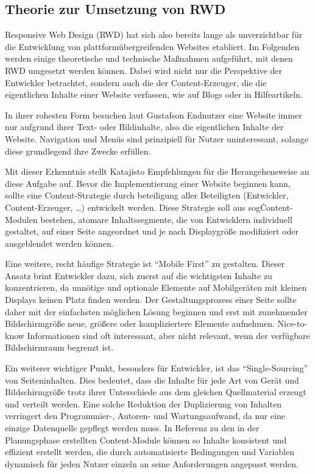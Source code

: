 
\subsection{Theorie zur Umsetzung von RWD}

Responsive Web Design (RWD) hat sich also bereits lange als unverzichtbar für die Entwicklung von plattformübergreifenden Websites etabliert.
Im Folgenden werden einige theoretische und technische Maßnahmen aufgeführt, mit denen RWD umgesetzt werden können.
Dabei wird nicht nur die Perspektive der Entwickler betrachtet, sondern auch die der Content-Erzeuger, die die eigentlichen Inhalte einer Website verfassen, wie auf Blogs oder in Hilfeartikeln.

In ihrer rohesten Form besuchen laut Gustafson \autocite[Kap. 1]{Gustafson.AdaptiveWebDesign.2011} Endnutzer eine Website immer nur aufgrund ihrer Text- oder Bildinhalte, also die eigentlichen Inhalte der Website.
Navigation und Menüs sind prinzipiell für Nutzer uninteressant, solange diese grundlegend ihre Zwecke erfüllen.

Mit dieser Erkenntnis stellt Katajisto \autocite[S. 4]{Katajisto.CreatingSupportContent.2015} Empfehlungen für die Herangehensweise an diese Aufgabe auf.
Bevor die Implementierung einer Website beginnen kann, sollte eine Content-Strategie durch beteiligung aller Beteiligten (Entwickler, Content-Erzeuger, \ldots) entwickelt werden.
Diese Strategie soll aus sog\. Content-Modulen bestehen, atomare Inhaltssegmente, die von Entwicklern individuell gestaltet, auf einer Seite angeordnet und je nach Displaygröße modifiziert oder ausgeblendet werden können.

Eine weitere, recht häufige Strategie ist "`Mobile First"' \autocite{Wroblewski.MobileFirst.2009} zu gestalten.
Dieser Ansatz brint Entwickler dazu, sich zuerst auf die wichtigsten Inhalte zu konzentrieren, da unnötige und optionale Elemente auf Mobilgeräten mit kleinen Displays keinen Platz finden werden.
Der Gestaltungsprozess einer Seite sollte daher mit der einfachsten möglichen Lösung beginnen und erst mit zunehmender Bildschirmgröße neue, größere oder kompliziertere Elemente aufnehmen.
Nice-to-know Informationen sind oft interessant, aber nicht relevant, wenn der verfügbare Bildschirmraum begrenzt ist.

Ein weiterer wichtiger Punkt, besonders für Entwickler, ist das "`Single-Sourcing"' \autocite[S. 3--4]{Katajisto.CreatingSupportContent.2015} von Seiteninhalten.
Dies bedeutet, dass die Inhalte für jede Art von Gerät und Bildschirmgröße trotz ihrer Unterschiede aus dem gleichen Quellmaterial erzeugt und verteilt werden.
Eine solche Reduktion der Duplizierung von Inhalten verringert den Programmier-, Autoren- und Wartungsaufwand, da nur eine einzige Datenquelle gepflegt werden muss.
In Referenz zu den in der Planungsphase erstellten Content-Module können so Inhalte konsistent und effizient erstellt werden, die durch automatisierte Bedingungen und Variablen dynamisch für jeden Nutzer einzeln an seine Anforderungen angepasst werden.

